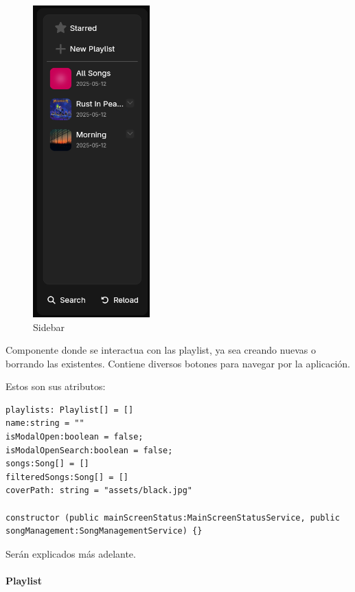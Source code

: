 \documentclass[11pt, a4paper]{article}
\begin{document}
            \begin{figure}[H]
                \centering
                \includegraphics[width=0.4\textwidth]{media/screenshots/sidebar.png}
                \caption{Sidebar}
                \label{fig:sidebar}
            \end{figure}

            Componente donde se interactua con las playlist, ya sea creando nuevas o borrando las existentes. Contiene diversos botones para navegar por la aplicación.

            Estos son sus atributos:

            \begin{lstlisting}[caption={Atributos Y Constructora Sidebar}]
playlists: Playlist[] = []
name:string = ""
isModalOpen:boolean = false;
isModalOpenSearch:boolean = false;
songs:Song[] = []
filteredSongs:Song[] = []
coverPath: string = "assets/black.jpg"

constructor (public mainScreenStatus:MainScreenStatusService, public songManagement:SongManagementService) {}
            \end{lstlisting}

            Serán explicados más adelante.

                \paragraph{Playlist}
                ‎ 
\end{document}

